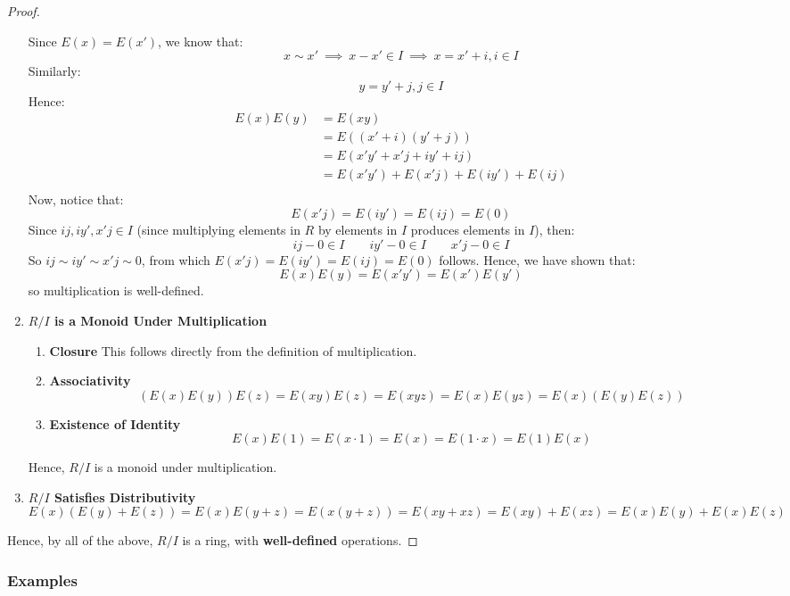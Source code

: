 \documentclass{exam}
\begin{document}
\begin{proof}
\begin{enumerate}
    Since $E(x) = E(x')$, we know that:
    \[
    x \sim x' \ \implies \ x - x' \in I \ \implies \ x = x' + i, i \in I 
    \]
    Similarly:
    \[
    y = y' + j, j \in I
    \]
    Hence:
    \begin{align*}
        E(x)E(y) &= E(xy) \\
                 &= E((x' + i)(y' + j)) \\
                 &= E(x'y' + x'j + iy' + ij) \\
                 &= E(x'y') + E(x'j) + E(iy') + E(ij) \\
    \end{align*}
    Now, notice that:
\[
E(x'j) = E(iy') = E(ij) = E(0)
\]
Since $ij, iy', x'j \in I$ (since multiplying elements in $R$ by elements in $I$ produces elements in $I$), then:
\[
ij - 0 \in I \qquad iy' - 0 \in I \qquad x'j - 0 \in I
\]
So $ij \sim iy' \sim x'j \sim 0$, from which $E(x'j) = E(iy') = E(ij) = E(0)$ follows. Hence, we have shown that:
\[
E(x)E(y) = E(x'y') = E(x')E(y')
\]
so multiplication is well-defined.

\item \textbf{$R/I$ is a Monoid Under Multiplication}

\begin{enumerate}
    \item \textbf{Closure} This follows directly from the definition of multiplication.
    \item \textbf{Associativity}
    \[
    (E(x)E(y))E(z) = E(xy)E(z) = E(xyz) = E(x)E(yz) = E(x)(E(y)E(z))
    \]
    \item \textbf{Existence of Identity}
    \[
    E(x)E(1) = E(x \cdot 1) = E(x) = E(1 \cdot x) = E(1)E(x)
    \]
\end{enumerate}
Hence, $R / I$ is a monoid under multiplication.

\item \textbf{$R / I$ Satisfies Distributivity}
\[
E(x)(E(y) + E(z)) = E(x)E(y+z) = E(x(y+z)) = E(xy + xz) = E(xy) + E(xz) = E(x)E(y) + E(x)E(z)
\]
\end{enumerate}

Hence, by all of the above, $R/I$ is a ring, with \textbf{well-defined} operations.

\end{proof}

\subsubsection{Examples}
\end{document}
